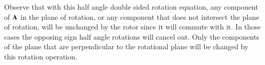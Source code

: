 \documentclass{article}      %
\DeclareMathOperator{\Exp}{e}
\newcommand{\gpgrade}[2] {{\left\langle{{#1}}\right\rangle}_{#2}}
\newcommand{\gpgradetwo}[1] {\gpgrade{#1}{2}}
\begin{document}
Observe that with this half angle double sided rotation equation, 
any component of $\mathbf{A}$ in the plane of rotation, or any component that does not intersect the plane of rotation, will be unchanged by the rotor
since it will commute with it.  In those cases the opposing sign half angle rotations will cancel out.
Only the components of the plane that are perpendicular to the rotational plane will be changed by this rotation operation.

%
%
%
%
%
%
%
%
%
%
%
\end{document}
